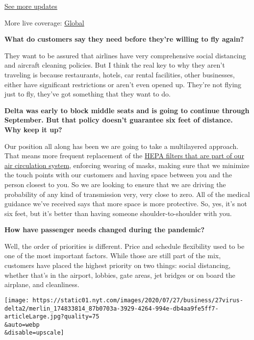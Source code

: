 \href{https://www.nytimes.com/live/2020/08/04/business/stock-market-today-coronavirus?action=click\&pgtype=Article\&state=default\&region=MAIN_CONTENT_1\&context=storylines_live_updates}{See
more updates}

More live coverage:
\href{https://www.nytimes.com/2020/08/04/world/coronavirus-cases.html?action=click\&pgtype=Article\&state=default\&region=MAIN_CONTENT_1\&context=storylines_live_updates}{Global}

\textbf{What do customers say they need before they're willing to fly
again?}

They want to be assured that airlines have very comprehensive social
distancing and aircraft cleaning policies. But I think the real key to
why they aren't traveling is because restaurants, hotels, car rental
facilities, other businesses, either have significant restrictions or
aren't even opened up. They're not flying just to fly, they've got
something that they want to do.

\textbf{Delta was early to block middle seats and is going to continue
through September. But that policy doesn't guarantee six feet of
distance. Why keep it up?}

Our position all along has been we are going to take a multilayered
approach. That means more frequent replacement of the
\href{https://www.nytimes.com/2020/04/30/business/airlines-masks-coronavirus-passengers.html}{HEPA
filters that are part of our air circulation system}, enforcing wearing
of masks, making sure that we minimize the touch points with our
customers and having space between you and the person closest to you. So
we are looking to ensure that we are driving the probability of any kind
of transmission very, very close to zero. All of the medical guidance
we've received says that more space is more protective. So, yes, it's
not six feet, but it's better than having someone shoulder-to-shoulder
with you.

\textbf{How have passenger needs changed during the pandemic?}

Well, the order of priorities is different. Price and schedule
flexibility used to be one of the most important factors. While those
are still part of the mix, customers have placed the highest priority on
two things: social distancing, whether that's in the airport, lobbies,
gate areas, jet bridges or on board the airplane, and cleanliness.

\texttt{[image: https://static01.nyt.com/images/2020/07/27/business/27virus-delta2/merlin\_174833814\_87b0703a-3929-4264-994e-db4aa9fe5ff7-articleLarge.jpg?quality=75\\\&auto=webp\\\&disable=upscale]}

